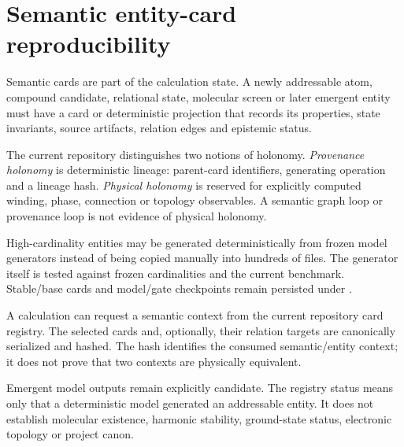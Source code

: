 \section{Semantic entity-card reproducibility}
Semantic cards are part of the calculation state.  A newly addressable atom, compound candidate, relational state, molecular screen or later emergent entity must have a card or deterministic projection that records its properties, state invariants, source artifacts, relation edges and epistemic status.

The current repository distinguishes two notions of holonomy.  \emph{Provenance holonomy} is deterministic lineage: parent-card identifiers, generating operation and a lineage hash.  \emph{Physical holonomy} is reserved for explicitly computed winding, phase, connection or topology observables.  A semantic graph loop or provenance loop is not evidence of physical holonomy.

High-cardinality entities may be generated deterministically from frozen model generators instead of being copied manually into hundreds of files.  The generator itself is tested against frozen cardinalities and the current benchmark.  Stable/base cards and model/gate checkpoints remain persisted under .

A calculation can request a semantic context from the current repository card registry.  The selected cards and, optionally, their relation targets are canonically serialized and hashed.  The hash identifies the consumed semantic/entity context; it does not prove that two contexts are physically equivalent.

Emergent model outputs remain explicitly candidate.  The registry status  means only that a deterministic model generated an addressable entity.  It does not establish molecular existence, harmonic stability, ground-state status, electronic topology or project canon.

